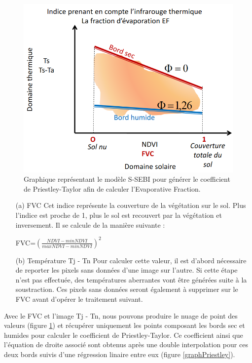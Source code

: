 \documentclass[10pt,a4paper]{article}
\begin{document}
\begin{figure}[!h]
\centering
\includegraphics[scale=0.313]{img/graph_fvc_temp.png}
\caption{Graphique représentant le modèle S-SEBI pour générer le coefficient de Priestley-Taylor afin de calculer l'Evaporative Fraction.}
\label{graphFVCTemp}
\end{figure}

\begin{enumerate}
\item[(a)]FVC \medbreak
Cet indice représente la couverture de la végétation sur le sol. Plus l'indice est proche de 1, plus le sol est recouvert par la végétation et inversement. Il se calcule de la manière suivante :
\begin{center}
\textrm{FVC}=$ (\frac{NDVI-minNDVI}{maxNDVI-minNDVI})^2 $
\end{center}\smallbreak

\item[(b)]Température Tj - Tn \medbreak
Pour calculer cette valeur, il est d'abord nécessaire de reporter les pixels sans données d'une image sur l'autre. Si cette étape n'est pas effectuée, des températures aberrantes vont être générées suite à la soustraction. Ces pixels sans données seront également à supprimer sur le FVC avant d'opérer le traitement suivant.
\end{enumerate}

Avec le FVC et l'image Tj - Tn, nous pouvons produire le nuage de point des valeurs (figure \ref{graphFVCTemp}) et récupérer uniquement les points composant les bords sec et humides pour calculer le coefficient de Priestley-Taylor. Ce coefficient ainsi que l'équation de droite associé sont obtenus après une double interpolation pour ces deux bords suivis d'une régression linaire entre eux (figure \ref{graphPriestley}).
\end{document}
